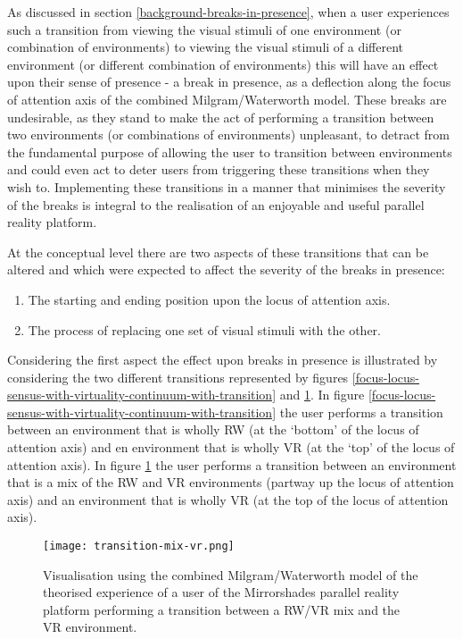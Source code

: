 As discussed in section \ref{background-breaks-in-presence}, when a user experiences such a transition from viewing the visual stimuli of one environment (or combination of environments) to viewing the visual stimuli of a different environment (or different combination of environments) this will have an effect upon their sense of presence - a break in presence, as a deflection along the focus of attention axis of the combined Milgram/Waterworth model. These breaks are undesirable, as they stand to make the act of performing a transition between two environments (or combinations of environments) unpleasant, to detract from the fundamental purpose of allowing the user to transition between environments and could even act to deter users from triggering these transitions when they wish to. Implementing these transitions in a manner that minimises the severity of the breaks is integral to the realisation of an enjoyable and useful parallel reality platform.

At the conceptual level there are two aspects of these transitions that can be altered and which were expected to affect the severity of the breaks in presence:

\begin{enumerate}
	\item The starting and ending position upon the locus of attention axis.
	\item The process of replacing one set of visual stimuli with the other.
\end{enumerate}

Considering the first aspect the effect upon breaks in presence is illustrated by considering the two different transitions represented by figures \ref{focus-locus-sensus-with-virtuality-continuum-with-transition} and \ref{transition-mix-vr.png}. In figure \ref{focus-locus-sensus-with-virtuality-continuum-with-transition} the user performs a transition between an environment that is wholly RW (at the `bottom' of the locus of attention axis) and en environment that is wholly VR (at the `top' of the locus of attention axis). In figure \ref{transition-mix-vr.png} the user performs a transition between an environment that is a mix of the RW and VR environments (partway up the locus of attention axis) and an environment that is wholly VR (at the top of the locus of attention axis).

\begin{figure}[h]
	\begin{center}
		\texttt{[image: transition-mix-vr.png]}
		\caption{Visualisation using the combined Milgram/Waterworth model of the theorised experience of a user of the Mirrorshades parallel reality platform performing a transition between a RW/VR mix and the VR environment.}
		\label{transition-mix-vr.png}
	\end{center}
\end{figure}


